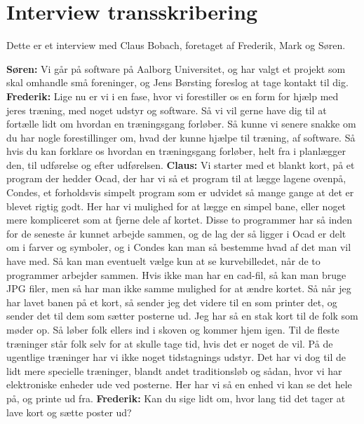 \chapter{Interview transskribering}
Dette er et interview med Claus Bobach, foretaget af Frederik, Mark og Søren. 

\textbf{Søren:} Vi går på software på Aalborg Universitet, og har valgt et projekt som skal omhandle små foreninger, og Jens Børsting foreslog at tage kontakt til dig.\newline
\textbf{Frederik:} Lige nu er vi i en fase, hvor vi forestiller os en form for hjælp med jeres træning, med noget udstyr og software. Så vi vil gerne have dig til at fortælle lidt om hvordan en træningsgang forløber. Så kunne vi senere snakke om du har nogle forestillinger om, hvad der kunne hjælpe til træning, af software. Så hvis du kan forklare os hvordan en træningsgang forløber, helt fra i planlægger den, til udførelse og efter udførelsen.\newline
\textbf{Claus:} Vi starter med et blankt kort, på et program der hedder Ocad, der har vi så et program til at lægge lagene ovenpå, Condes, et forholdsvis simpelt program som er udvidet så mange gange at det er blevet rigtig godt. Her har vi mulighed for at lægge en simpel bane, eller noget mere kompliceret som at fjerne dele af kortet. Disse to programmer har så inden for de seneste år kunnet arbejde sammen, og de lag der så ligger i Ocad er delt om i farver og symboler, og i Condes kan man så bestemme hvad af det man vil have med. Så kan man eventuelt vælge kun at se kurvebilledet, når de to programmer arbejder sammen. Hvis ikke man har en cad-fil, så kan man bruge JPG filer, men så har man ikke samme mulighed for at ændre kortet. 
Så når jeg har lavet banen på et kort, så sender jeg det videre til en som printer det, og sender det til dem som sætter posterne ud. Jeg har så en stak kort til de folk som møder op. Så løber folk ellers ind i skoven og kommer hjem igen. \newline
Til de fleste træninger står folk selv for at skulle tage tid, hvis det er noget de vil. På de ugentlige træninger har vi ikke noget tidstagnings udstyr. Det har vi dog til de lidt mere specielle træninger, blandt andet traditionsløb og sådan, hvor vi har elektroniske enheder ude ved posterne. Her har vi så en enhed vi kan se det hele på, og printe ud fra. \newline
\textbf{Frederik:} Kan du sige lidt om, hvor lang tid det tager at lave kort og sætte poster ud?\newline
